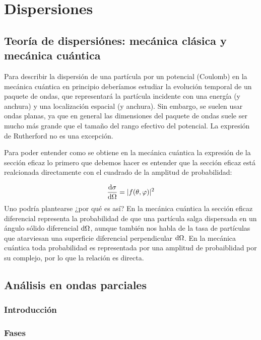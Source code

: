 \chapter{Dispersiones}

\section{Teoría de dispersiónes: mecánica clásica y  mecánica cuántica}

Para describir la dispersión de una partícula por un potencial (Coulomb) en la mecánica cuántica en principio deberíamos estudiar la evolución temporal de un paquete de ondas, que representará la partícula incidente con una energía (y anchura) y una localización espacial (y anchura). Sin embargo, se suelen usar ondas planas, ya que en general las dimensiones del paquete de ondas suele ser mucho más grande que el tamaño del rango efectivo del potencial. La expresión de Rutherford no es una excepción.  

Para poder entender como se obtiene en la mecánica cuántica la expresión de la sección eficaz lo primero que debemos hacer es entender que la sección eficaz está realcionada directamente con el cuadrado de la amplitud de probabilidad:

\begin{equation}
    \dv{\sigma}{\Omega} = |f(\theta,\varphi)|^2 
\end{equation}
Uno podría plantearse ¿por qué es así? En la mecánica cuántica la sección eficaz diferencial representa la probabilidad de que una partícula salga dispersada en un ángulo sólido diferencial $\mathrm{d} \Omega$, aunque también nos habla de la tasa de partículas que atarviesan una superficie diferencial perpendicular $\mathrm{d} \Omega$. En la mecánica cuántica toda probabilidad es representada por una amplitud de probaiblidad por su complejo, por lo que la relación es directa. 

\section{Análisis en ondas parciales}

\subsection{Introducción}

\subsection{Fases}

